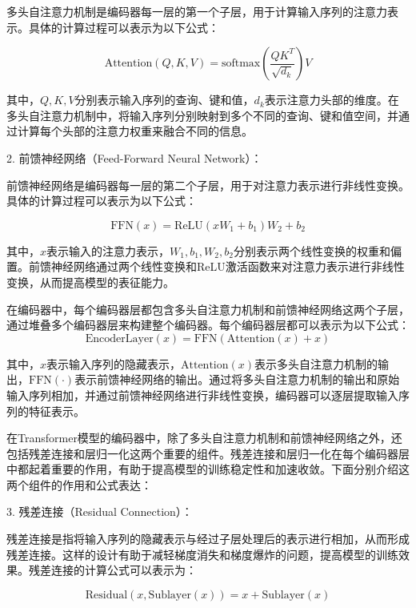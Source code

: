 多头自注意力机制是编码器每一层的第一个子层，用于计算输入序列的注意力表示。具体的计算过程可以表示为以下公式：

\begin{equation}
	\text{Attention}(Q, K, V) = \text{softmax}\left(\frac{QK^T}{\sqrt{d_k}}\right)V
\end{equation}

其中，$Q, K, V$分别表示输入序列的查询、键和值，$d_k$表示注意力头部的维度。在多头自注意力机制中，将输入序列分别映射到多个不同的查询、键和值空间，并通过计算每个头部的注意力权重来融合不同的信息。

2. 前馈神经网络（Feed-Forward Neural Network）：

前馈神经网络是编码器每一层的第二个子层，用于对注意力表示进行非线性变换。具体的计算过程可以表示为以下公式：

\begin{equation}
	\text{FFN}(x) = \text{ReLU}(xW_1 + b_1)W_2 + b_2
\end{equation}


其中，$x$表示输入的注意力表示，$W_1, b_1, W_2, b_2$分别表示两个线性变换的权重和偏置。前馈神经网络通过两个线性变换和ReLU激活函数来对注意力表示进行非线性变换，从而提高模型的表征能力。

在编码器中，每个编码器层都包含多头自注意力机制和前馈神经网络这两个子层，通过堆叠多个编码器层来构建整个编码器。每个编码器层都可以表示为以下公式：
\begin{equation}
	\text{EncoderLayer}(x) = \text{FFN}(\text{Attention}(x) + x)
\end{equation}

其中，$x$表示输入序列的隐藏表示，$\text{Attention}(x)$表示多头自注意力机制的输出，$\text{FFN}(\cdot)$表示前馈神经网络的输出。通过将多头自注意力机制的输出和原始输入序列相加，并通过前馈神经网络进行非线性变换，编码器可以逐层提取输入序列的特征表示。

在Transformer模型的编码器中，除了多头自注意力机制和前馈神经网络之外，还包括残差连接和层归一化这两个重要的组件。残差连接和层归一化在每个编码器层中都起着重要的作用，有助于提高模型的训练稳定性和加速收敛。下面分别介绍这两个组件的作用和公式表达：


3. 残差连接（Residual Connection）：

残差连接是指将输入序列的隐藏表示与经过子层处理后的表示进行相加，从而形成残差连接。这样的设计有助于减轻梯度消失和梯度爆炸的问题，提高模型的训练效果。残差连接的计算公式可以表示为：

\begin{equation}
	\text{Residual}(x, \text{Sublayer}(x)) = x + \text{Sublayer}(x)
\end{equation}


